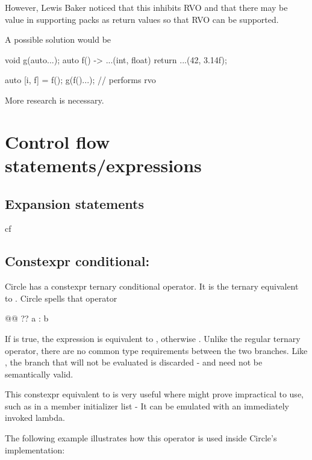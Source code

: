 \documentclass{wg21}
\begin{document}
However, Lewis Baker noticed that this inhibits RVO and that there may be value in supporting packs as return values so that RVO can be supported.

A possible solution would be

\begin{colorblock}
void g(auto...);
auto f() -> ...(int, float) {
    return ...(42, 3.14f);
}

auto [i, f] = f();
g(f()...); // performs rvo
\end{colorblock}


More research is necessary.

\section{Control flow statements/expressions}

\subsection{Expansion statements}

cf 

\subsection{Constexpr conditional: }

Circle has a constexpr ternary conditional operator.
It is the ternary equivalent to .
Circle spells that operator 

\begin{colorblock}
@@ ?? a : b
\end{colorblock}

If  is true, the expression is equivalent to , otherwise .
Unlike the regular ternary operator, there are no common type requirements between the two branches.
Like , the branch that will not be evaluated is discarded - and need not be semantically valid.

This constexpr equivalent to  is very useful where  might prove impractical to use, such as
in a member initializer list - It can be emulated with an immediately invoked lambda.

The following example illustrates how this operator is used inside Circle's  implementation:
\end{document}
